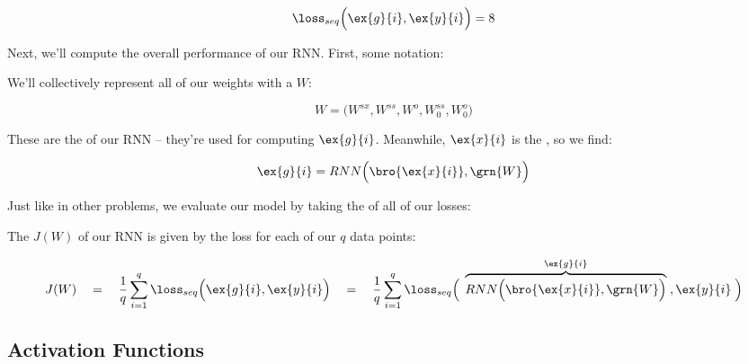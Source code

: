         \begin{equation}
            \loss_{seq} \Big(
                \ex{g}{i}, \ex{y}{i} 
            \Big) 
            =
            8
        \end{equation}

        Next, we'll compute the overall performance of our RNN. First, some notation:\\

        \begin{notation}
            We'll collectively represent all of our weights with a $W$:

            \begin{equation*}
                W =\Big( W^{sx}, W^{ss}, W^o, W^{ss}_0, W_0^o \Big)
            \end{equation*}

            These are the  of our RNN -- they're used for computing $\ex{g}{i}$. Meanwhile, $\ex{x}{i}$ is the , so we find:

            \begin{equation*}
                \ex{g}{i} = RNN \Big( \bro{\ex{x}{i}}, \grn{W}  \Big)
            \end{equation*}
        \end{notation}

        Just like in other problems, we evaluate our model by taking the  of all of our losses:\\

        \begin{definition}
            The  $J(W)$ of our RNN is given by  the loss for each of our $q$ data points:

            \begin{equation*}
                J(W) 
                \quad=\quad 
                \frac{1}{q} \sum_{i=1}^q \loss_{seq} \Big(
                    \ex{g}{i}, \ex{y}{i} 
                \Big) 
                \quad = \quad
                \frac{1}{q} \sum_{i=1}^q \loss_{seq} \Big(\;
                    \overbrace{RNN \Big( \bro{\ex{x}{i}}, \grn{W}  \Big)
                    }^{\ex{g}{i}}
                    \;, \ex{y}{i} 
                \;\Big) 
            \end{equation*}
        \end{definition}

    \subsection{Activation Functions}

